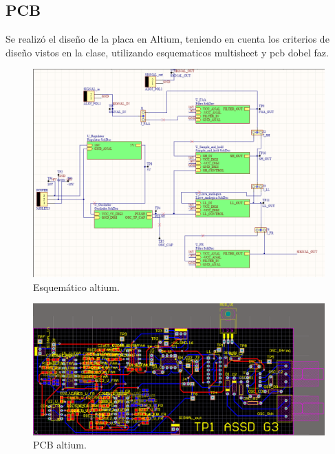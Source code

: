 \subsection{PCB}
Se realizó el diseño de la placa en Altium, teniendo en cuenta los criterios de diseño vistos en la clase, utilizando esquematicos multisheet y pcb dobel faz.
\begin{figure}[H]
\centering
	\includegraphics[width=0.8\linewidth]{ImagenesEjercicio6/main.png}
	\caption{Esquemático altium.}
	\label{fig:esq}
\end{figure}
\begin{figure}[H]
\centering
	\includegraphics[width=1\linewidth]{ImagenesEjercicio6/placa.png}
	\caption{PCB altium.}
	\label{fig:pcb}
\end{figure}
